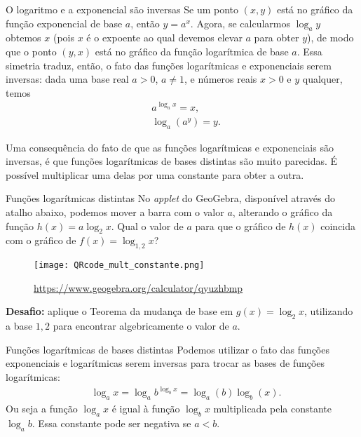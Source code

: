 \begin{observationtitle}{O logaritmo e a exponencial são inversas}
Se um ponto $(x,y)$ está no gráfico da função exponencial de base $a$, então $y= a^x$. Agora, se calcularmos $\log_a y$ obtemos $x$ (pois $x$ é o expoente ao qual devemos elevar $a$ para obter $y$), de modo que o ponto $(y,x)$ está no gráfico da função logarítmica de base $a$. Essa simetria traduz, então, o fato das funções logarítmicas e exponenciais serem inversas: dada uma base real $a>0$, $a \neq 1$, e números reais $x>0$ e $y$ qualquer, temos
\begin{align*}
& a^{\log_a x}=x,\\
& \log_a (a^y) = y.
\end{align*}
\end{observationtitle}


Uma consequência do fato de que as funções logarítmicas e exponenciais são inversas, é que funções logarítmicas de bases distintas são muito parecidas. É possível multiplicar uma delas por uma constante para obter a outra.

\vspace{-1em}
\begin{task}{Funções logarítmicas distintas}
No \textit{applet} do GeoGebra, disponível através do atalho abaixo, podemos mover a barra com o valor $a$, alterando o gráfico da função $h(x) = a \log_2 x$. Qual o valor de $a$ para que o gráfico de $h(x)$ coincida com o gráfico de $f(x) = \log_{1{,}2} x$?


\begin{figure}[H]
\centering

\texttt{[image: QRcode\_mult\_constante.png]}

\url{https://www.geogebra.org/calculator/qyuzhbmp}
\end{figure}

\textbf{Desafio:} aplique o Teorema da mudança de base em $g(x)= \log_2 x$, utilizando a base $1{,}2$ para encontrar algebricamente o valor de $a$.
\end{task}


\begin{observationtitle}{Funções logarítmicas de bases distintas}
Podemos utilizar o fato das funções exponenciais e logarítmicas serem inversas para trocar as bases de funções logarítmicas:
\begin{align*}
&\log_a x = \log_a b^{\log_b x} =\log_a (b)\log_b (x).
\end{align*}
Ou seja a função $\log_a x$ é igual à função $\log_b x$ multiplicada pela constante $\log_a b$. Essa constante pode ser negativa se $a<b$.
\end{observationtitle}

